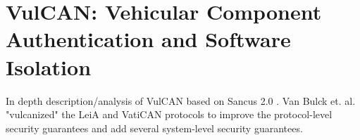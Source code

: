 
\section{VulCAN: Vehicular Component Authentication and Software Isolation}
\label{sec:vulcan}

In depth description/analysis of VulCAN \cite{VanBulck2017} based on Sancus 2.0
\cite{Noorman}. Van Bulck et. al. "vulcanized" the LeiA and VatiCAN protocols to
improve the protocol-level security guarantees and add several system-level
security guarantees.
